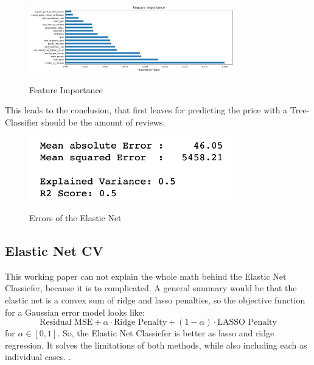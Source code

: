 \documentclass[journal]{IEEEtran}
\begin{document}
\begin{figure}
  \begin{center}
  \includegraphics[width=3.5in]{photo/7_feature_importance.png}\\
  \caption{Feature Importance}\label{feature_importance}
  \end{center}
\end{figure}

This leads to the conclusion, that first leaves for predicting the price with a Tree-Classifier should be the amount of reviews. 

\begin{figure}
  \begin{center}
  \includegraphics[width=3.5in]{photo/elastic_net.png}\\
  \caption{Errors of the Elastic Net}\label{elastic_net}
  \end{center}
\end{figure}

\subsection{Elastic Net CV}
\noindent This working paper can not explain the whole math behind the Elastic Net Classiefer, because it is to complicated. A general summary would be that the elastic net is a convex sum of ridge and lasso penalties, so the objective function for a Gaussian error model looks like:
\begin{equation}
\text{Residual MSE}+\alpha \cdot \text{Ridge Penalty}+(1-\alpha)\cdot \text{LASSO Penalty}
\end{equation}
for \(\alpha\in[0,1]\). 
So, the Elastic Net Classiefer is better as lasso and ridge regression.  It solves the limitations of both methods, while also including each as individual cases. \cite{Zou}.  
\end{document}

